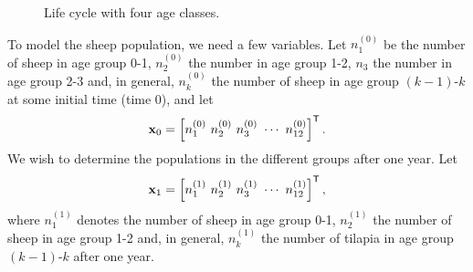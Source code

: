 \begin{figure}[ht]
\begin{center}
\caption{Life cycle with four age classes.}
\label{F:Life_cycle}
\end{center}
\end{figure}


\begin{comment}
\begin{figure}[ht]
\begin{center}
\begin{tikzpicture}[scale=0.6]
	\def\firstcircle{(0,0) circle (1cm)}
	\def\secondcircle{(4,0) circle (1cm)}
	\def\thirdcircle{(8,0) circle (1cm)}
	\def\fourthcircle{(12,0) circle (1cm)}
	\draw[thick] \firstcircle;
	\draw[thick] \secondcircle;	
	\draw[thick] \thirdcircle;	
	\draw[thick] \fourthcircle;		
	\draw[->, thick](1.2,0) -- (2.8,0);
	\draw[->, thick](5.2,0) -- (6.8,0);
	\draw[->, thick](9.2,0) -- (10.8,0);
	\draw[->,thick] (3.2,1.0) to [out=160,in=30](0.8,1.0);
	\draw[->,thick] (7.2,1.0) to [out=150,in=40](0.8,1.0);
	\draw[->,thick] (11.2,1.0) to [out=140,in=50](0.8,1.0);
	\draw[thick] [->] (-1.2,0.2) arc (30:330:0.5); %
	\node at (0,0) {$1$};
	\node at (4,0) {$2$};
	\node at (8,0) {$3$};
	\node at (12,0) {$4$};
	\node at (2,-0.4) {$s_1$};
	\node at (6,-0.4) {$s_2$};
	\node at (10,-0.4) {$s_3$};
	\node at (-2.45,0.0) {$F_1$};
	\node at (2,0.95) {$F_2$};
	\node at (4,1.7) {$F_3$};
	\node at (5.7,2.8) {$F_4$};
\end{tikzpicture}
\caption{Life cycle with four age classes.}
\label{F:Life_cycle}
\end{center}
\end{figure}
\end{comment}

To model the sheep population, we need a few variables. Let $n_1^{(0)}$ be the number of sheep in age group 0-1, $n_2^{(0)}$ the number in age group 1-2, $n_3$ the number in age group 2-3 and, in general, $n_k^{(0)}$ the number of sheep in age group $(k-1)$-$k$ at some initial time (time $0$), and let 
\[\vx_0 = \left[ n_1^{(0)} \ n_2^{(0)} \ n_3^{(0)} \ \cdots \ n_{12}^{(0)} \right]^{\tr}.\]
We wish to determine the populations in the different groups after one year. Let 
\[\vx_1 = \left[ n_1^{(1)} \ n_2^{(1)} \ n_3^{(1)}  \ \cdots \ n_{12}^{(1)} \right]^{\tr},\]
where $n_1^{(1)}$ denotes the number of sheep in age group 0-1, $n_2^{(1)}$ the number of sheep in age group 1-2 and, in general, $n_{k}^{(1)}$ the number of tilapia in age group $(k-1)$-$k$ after one year. 

